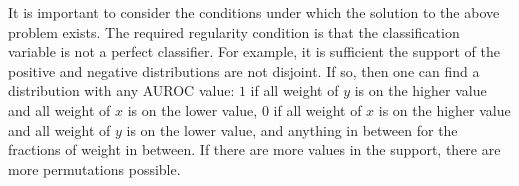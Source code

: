 

%
%
%
%
%
%
%
%



It is important to consider the conditions under which the solution to the above problem exists.
%
The required regularity condition is that the classification variable is not a perfect classifier.
For example, it is sufficient the support of the positive and negative distributions are not disjoint.
If so, then one can find a distribution with any AUROC value:
$1$ if all weight of $y$ is on the higher value and all weight of $x$ is on the lower value,
$0$ if all weight of $x$ is on the higher value and all weight of $y$ is on the lower value,
and anything in between for the fractions of weight in between.
If there are more values in the support, there are more permutations possible. 



